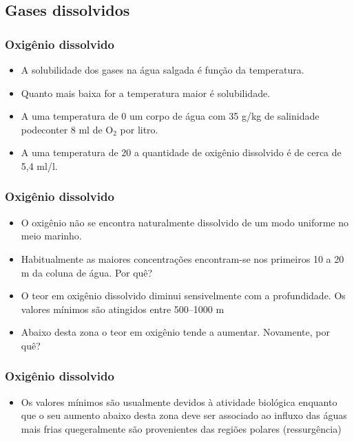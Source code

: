 \subsection{Gases dissolvidos}
\begin{frame}
\frametitle{Oxigênio dissolvido}
  \begin{itemize}[<+-| alert@+>]
    \item A solubilidade dos gases na água salgada é função da temperatura.
    \item Quanto mais baixa for a temperatura maior é solubilidade.
    \item A uma temperatura de 0\textcelsius{} um corpo de água com 35 g/kg de
          salinidade podeconter 8 ml de O$_2$ por litro.
    \item A uma temperatura de 20\textcelsius{} a quantidade de oxigênio
          dissolvido é de cerca de 5,4 ml/l.
  \end{itemize}
\end{frame}


\begin{frame}
\frametitle{Oxigênio dissolvido}
  \begin{itemize}[<+-| alert@+>]
    \item O oxigênio não se encontra naturalmente dissolvido de um modo
          uniforme no meio marinho.
    \item Habitualmente as maiores concentrações encontram-se nos primeiros
          10 a 20 m da coluna de água. Por quê?
    \item O teor em oxigênio dissolvido diminui sensivelmente com a
          profundidade. Os valores mínimos são atingidos entre 500--1000 m
    \item Abaixo desta zona o teor em oxigênio tende a aumentar. Novamente, por
          quê?
  \end{itemize}
\end{frame}


\begin{frame}
\frametitle{Oxigênio dissolvido}
  \begin{itemize}[<+-| alert@+>]
    \item Os valores mínimos são usualmente devidos à atividade biológica
          enquanto que o seu aumento abaixo desta zona deve ser associado ao
          influxo das águas mais frias quegeralmente são provenientes das
          regiões polares (ressurgência)
  \end{itemize}
\end{frame}


